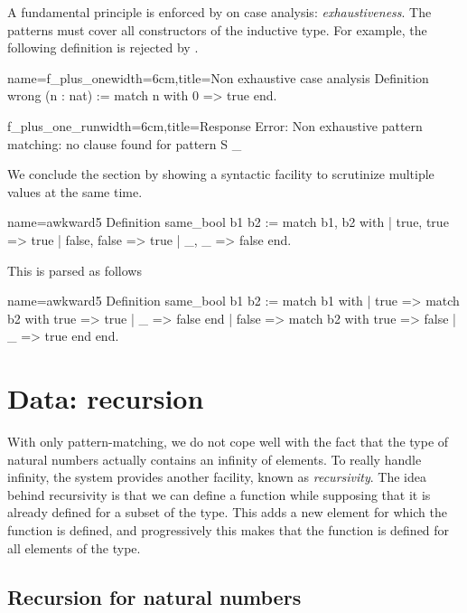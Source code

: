 A fundamental principle is enforced by \Coq{} on case analysis:
\emph{exhaustiveness}.  The patterns must cover all constructors of
the inductive type.  For example, the following definition is
rejected by \Coq{}.

\begin{coq}{name=f_plus_one}{width=6cm,title=Non exhaustive case analysis}
Definition wrong (n : nat) :=
  match n with 0 => true end.
$~$
\end{coq}
\begin{coqout}{f_plus_one_run}{width=6cm,title=Response}
Error: Non exhaustive pattern
matching: no clause found for
pattern S _
\end{coqout}

We conclude the section by showing a syntactic facility to scrutinize
multiple values at the same time.

\begin{coq}{name=awkward5}{}
Definition same_bool b1 b2 :=
  match b1, b2 with
  | true, true => true
  | false, false => true
  | _, _ => false
  end.
\end{coq}

This is parsed as follows

\begin{coq}{name=awkward5}{}
Definition same_bool b1 b2 :=
  match b1 with
  | true => match b2 with true => true | _ => false end
  | false => match b2 with true => false | _ => true end
  end.
\end{coq}

\section{Data: recursion}

With only pattern-matching, we do not cope well with the fact that the
type  of natural numbers actually contains an infinity of
elements.  To really handle infinity, the \Coq{} system provides another
facility, known as {\em recursivity}.  The idea behind recursivity is
that we can define a function while supposing that it is already
defined for a subset of the type.  This adds a new element for which
the function is defined, and progressively this makes that the
function is defined for all elements of the type.

\subsection{Recursion for natural numbers}

